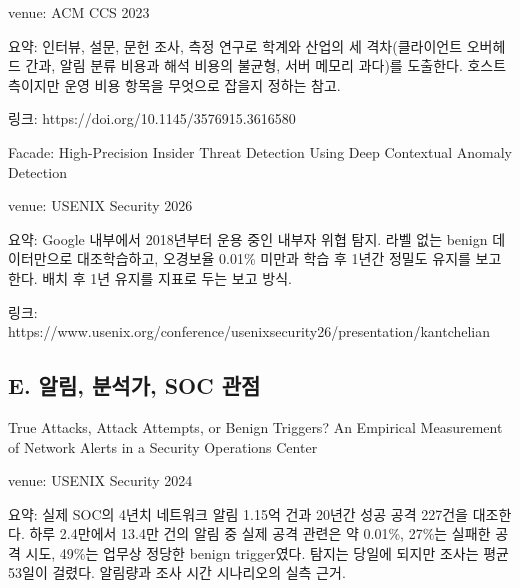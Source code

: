 \par\noindent \textbullet\enspace venue: ACM CCS 2023


\par\noindent \textbullet\enspace 요약: 인터뷰, 설문, 문헌 조사, 측정 연구로 학계와 산업의 세 격차(클라이언트 오버헤드 간과, 알림 분류 비용과 해석 비용의 불균형, 서버 메모리 과다)를 도출한다. 호스트 측이지만 운영 비용 항목을 무엇으로 잡을지 정하는 참고.


\par\noindent \textbullet\enspace 링크: https:/\allowbreak{}/\allowbreak{}doi.org/\allowbreak{}10.1145/\allowbreak{}3576915.3616580


\par\noindent \textbullet\enspace Facade: High-Precision Insider Threat Detection Using Deep Contextual Anomaly Detection


\par\noindent \textbullet\enspace venue: USENIX Security 2026


\par\noindent \textbullet\enspace 요약: Google 내부에서 2018년부터 운용 중인 내부자 위협 탐지. 라벨 없는 benign 데이터만으로 대조학습하고, 오경보율 0.01\% 미만과 학습 후 1년간 정밀도 유지를 보고한다. 배치 후 1년 유지를 지표로 두는 보고 방식.


\par\noindent \textbullet\enspace 링크: https:/\allowbreak{}/\allowbreak{}www.usenix.org/\allowbreak{}conference/\allowbreak{}usenixsecurity26/\allowbreak{}presentation/\allowbreak{}kantchelian


\subsection{E. 알림, 분석가, SOC 관점}
\par\noindent \textbullet\enspace True Attacks, Attack Attempts, or Benign Triggers? An Empirical Measurement of Network Alerts in a Security Operations Center


\par\noindent \textbullet\enspace venue: USENIX Security 2024


\par\noindent \textbullet\enspace 요약: 실제 SOC의 4년치 네트워크 알림 1.15억 건과 20년간 성공 공격 227건을 대조한다. 하루 2.4만에서 13.4만 건의 알림 중 실제 공격 관련은 약 0.01\%, 27\%는 실패한 공격 시도, 49\%는 업무상 정당한 benign trigger였다. 탐지는 당일에 되지만 조사는 평균 53일이 걸렸다. 알림량과 조사 시간 시나리오의 실측 근거.


